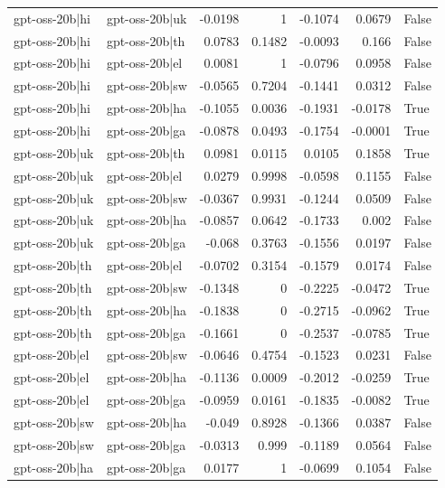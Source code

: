 \begin{table}
\begin{tabular}{l l r r r r l}
gpt-oss-20b|hi & gpt-oss-20b|uk & -0.0198 & 1 & -0.1074 & 0.0679 & False \\
gpt-oss-20b|hi & gpt-oss-20b|th & 0.0783 & 0.1482 & -0.0093 & 0.166 & False \\
gpt-oss-20b|hi & gpt-oss-20b|el & 0.0081 & 1 & -0.0796 & 0.0958 & False \\
gpt-oss-20b|hi & gpt-oss-20b|sw & -0.0565 & 0.7204 & -0.1441 & 0.0312 & False \\
gpt-oss-20b|hi & gpt-oss-20b|ha & -0.1055 & 0.0036 & -0.1931 & -0.0178 & True \\
gpt-oss-20b|hi & gpt-oss-20b|ga & -0.0878 & 0.0493 & -0.1754 & -0.0001 & True \\
gpt-oss-20b|uk & gpt-oss-20b|th & 0.0981 & 0.0115 & 0.0105 & 0.1858 & True \\
gpt-oss-20b|uk & gpt-oss-20b|el & 0.0279 & 0.9998 & -0.0598 & 0.1155 & False \\
gpt-oss-20b|uk & gpt-oss-20b|sw & -0.0367 & 0.9931 & -0.1244 & 0.0509 & False \\
gpt-oss-20b|uk & gpt-oss-20b|ha & -0.0857 & 0.0642 & -0.1733 & 0.002 & False \\
gpt-oss-20b|uk & gpt-oss-20b|ga & -0.068 & 0.3763 & -0.1556 & 0.0197 & False \\
gpt-oss-20b|th & gpt-oss-20b|el & -0.0702 & 0.3154 & -0.1579 & 0.0174 & False \\
gpt-oss-20b|th & gpt-oss-20b|sw & -0.1348 & 0 & -0.2225 & -0.0472 & True \\
gpt-oss-20b|th & gpt-oss-20b|ha & -0.1838 & 0 & -0.2715 & -0.0962 & True \\
gpt-oss-20b|th & gpt-oss-20b|ga & -0.1661 & 0 & -0.2537 & -0.0785 & True \\
gpt-oss-20b|el & gpt-oss-20b|sw & -0.0646 & 0.4754 & -0.1523 & 0.0231 & False \\
gpt-oss-20b|el & gpt-oss-20b|ha & -0.1136 & 0.0009 & -0.2012 & -0.0259 & True \\
gpt-oss-20b|el & gpt-oss-20b|ga & -0.0959 & 0.0161 & -0.1835 & -0.0082 & True \\
gpt-oss-20b|sw & gpt-oss-20b|ha & -0.049 & 0.8928 & -0.1366 & 0.0387 & False \\
gpt-oss-20b|sw & gpt-oss-20b|ga & -0.0313 & 0.999 & -0.1189 & 0.0564 & False \\
gpt-oss-20b|ha & gpt-oss-20b|ga & 0.0177 & 1 & -0.0699 & 0.1054 & False \\
\bottomrule
\end{tabular}
\end{table}
